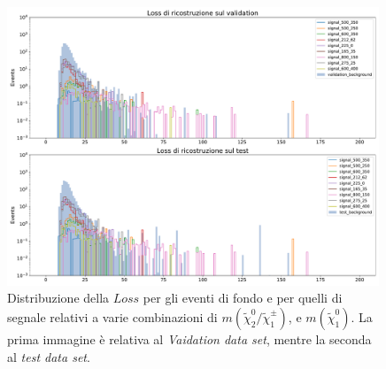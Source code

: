 \begin{figure}[h!]
	\centering
	\includegraphics[width=0.99\textwidth]{figs/risultati_simulazione/distribuzioneLoss.pdf}
	\caption{Distribuzione della $\textit{Loss}$ per gli eventi di fondo e per quelli di segnale relativi a varie combinazioni di $m(\tilde{\chi}^0_2/\tilde{\chi}_1^\pm)$, e $m(\tilde{\chi} ^0_1)$. La prima immagine è relativa al \textit{Vaidation data set}, mentre la seconda al \textit{test data set}.}
	\label{distribuzione_loss}
\end{figure}


